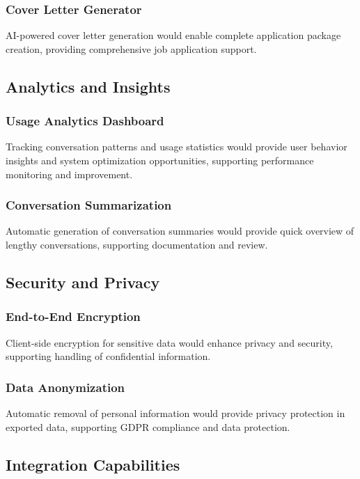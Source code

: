 \documentclass[conference]{IEEEtran}
\begin{document}
\subsubsection{Cover Letter Generator}
AI-powered cover letter generation would enable complete application package creation, providing comprehensive job application support.

\subsection{Analytics and Insights}

\subsubsection{Usage Analytics Dashboard}
Tracking conversation patterns and usage statistics would provide user behavior insights and system optimization opportunities, supporting performance monitoring and improvement.

\subsubsection{Conversation Summarization}
Automatic generation of conversation summaries would provide quick overview of lengthy conversations, supporting documentation and review.

\subsection{Security and Privacy}

\subsubsection{End-to-End Encryption}
Client-side encryption for sensitive data would enhance privacy and security, supporting handling of confidential information.

\subsubsection{Data Anonymization}
Automatic removal of personal information would provide privacy protection in exported data, supporting GDPR compliance and data protection.

\subsection{Integration Capabilities}
\end{document}
